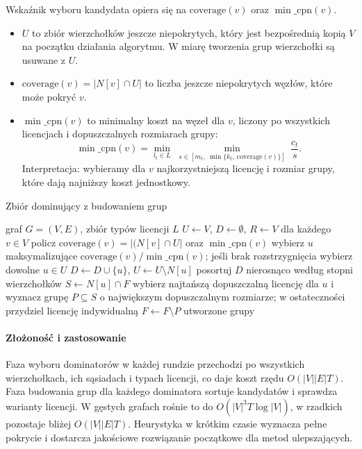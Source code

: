 Wskaźnik wyboru kandydata opiera się na \(\mathrm{coverage}(v)\) oraz \(\min\_\mathrm{cpn}(v)\).
\begin{itemize}
  \item $U$ to zbiór wierzchołków jeszcze niepokrytych, który jest bezpośrednią kopią $V$ na początku działania algorytmu. W miarę tworzenia grup wierzchołki są usuwane z $U$.
  \item \(\mathrm{coverage}(v)=|N[v]\cap U|\) to liczba jeszcze niepokrytych węzłów, które może pokryć \(v\).
  \item \(\min\_\mathrm{cpn}(v)\) to minimalny koszt na węzeł dla \(v\), liczony po wszystkich licencjach i dopuszczalnych rozmiarach grupy:
        \[
          \min\_\mathrm{cpn}(v)=\min_{l_t\in L}\;\min_{s\in[m_t,\;\min\{k_t,\ \mathrm{coverage}(v)\}]}\ \frac{c_t}{s}.
        \]
        Interpretacja: wybieramy dla \(v\) najkorzystniejszą licencję i rozmiar grupy, które dają najniższy koszt jednostkowy.
\end{itemize}

\begin{algorithm}[H]
  \caption{Zbiór dominujący z budowaniem grup}\label{alg:ds}
  \begin{algorithmic}[1]
    \Require graf $G=(V,E)$, zbiór typów licencji $L$
    \State $U\gets V$, $D\gets\emptyset$, $R\gets V$
    \State dla każdego $v\in V$ policz $\mathrm{coverage}(v)=|(N[v]\cap U|$ oraz $\min\_\mathrm{cpn}(v)$
    \State wybierz $u$ maksymalizujące $\mathrm{coverage}(v)/\min\_\mathrm{cpn}(v)$; jeśli brak rozstrzygnięcia wybierz dowolne $u\in U$
    \State $D\gets D\cup\{u\}$, $U\gets U\setminus N[u]$
    \EndWhile
    \State posortuj $D$ nierosnąco według stopni wierzchołków
    \State $S\gets N[u]\cap F$
    \State wybierz najtańszą dopuszczalną licencję dla $u$ i wyznacz grupę $P\subseteq S$ o największym dopuszczalnym rozmiarze; w ostateczności przydziel licencję indywidualną
    \State $F\gets F\setminus P$
    \EndFor
    \State \Return utworzone grupy
  \end{algorithmic}
\end{algorithm}

\paragraph{Złożoność i zastosowanie}
Faza wyboru dominatorów w każdej rundzie przechodzi po wszystkich wierzchołkach, ich sąsiadach i typach licencji, co daje koszt rzędu $O(|V||E|T)$. Faza budowania grup dla każdego dominatora sortuje kandydatów i sprawdza warianty licencji. W gęstych grafach rośnie to do \(O(|V|^3 T \log |V|)\), w rzadkich pozostaje bliżej $O(|V||E|T)$. Heurystyka w krótkim czasie wyznacza pełne pokrycie i dostarcza jakościowe rozwiązanie początkowe dla metod ulepszających.

